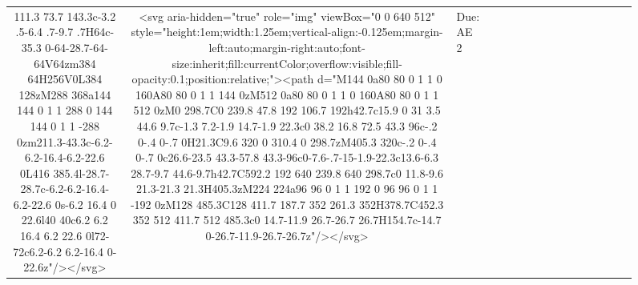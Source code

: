 \documentclass[
]{article}
\begin{document}
\begin{figure*}
\begin{longtable*}{cclllccccccccccl}
111.3 73.7 143.3c-3.2 .5-6.4 .7-9.7 .7H64c-35.3 0-64-28.7-64-64V64zm384 64H256V0L384 128zM288 368a144 144 0 1 1 288 0 144 144 0 1 1 -288 0zm211.3-43.3c-6.2-6.2-16.4-6.2-22.6 0L416 385.4l-28.7-28.7c-6.2-6.2-16.4-6.2-22.6 0s-6.2 16.4 0 22.6l40 40c6.2 6.2 16.4 6.2 22.6 0l72-72c6.2-6.2 6.2-16.4 0-22.6z"/></svg> & <svg aria-hidden="true" role="img" viewBox="0 0 640 512" style="height:1em;width:1.25em;vertical-align:-0.125em;margin-left:auto;margin-right:auto;font-size:inherit;fill:currentColor;overflow:visible;fill-opacity:0.1;position:relative;"><path d="M144 0a80 80 0 1 1 0 160A80 80 0 1 1 144 0zM512 0a80 80 0 1 1 0 160A80 80 0 1 1 512 0zM0 298.7C0 239.8 47.8 192 106.7 192h42.7c15.9 0 31 3.5 44.6 9.7c-1.3 7.2-1.9 14.7-1.9 22.3c0 38.2 16.8 72.5 43.3 96c-.2 0-.4 0-.7 0H21.3C9.6 320 0 310.4 0 298.7zM405.3 320c-.2 0-.4 0-.7 0c26.6-23.5 43.3-57.8 43.3-96c0-7.6-.7-15-1.9-22.3c13.6-6.3 28.7-9.7 44.6-9.7h42.7C592.2 192 640 239.8 640 298.7c0 11.8-9.6 21.3-21.3 21.3H405.3zM224 224a96 96 0 1 1 192 0 96 96 0 1 1 -192 0zM128 485.3C128 411.7 187.7 352 261.3 352H378.7C452.3 352 512 411.7 512 485.3c0 14.7-11.9 26.7-26.7 26.7H154.7c-14.7 0-26.7-11.9-26.7-26.7z"/></svg> & Due: AE 2 \\ 

\end{longtable*}
\end{figure*}
\end{document}
